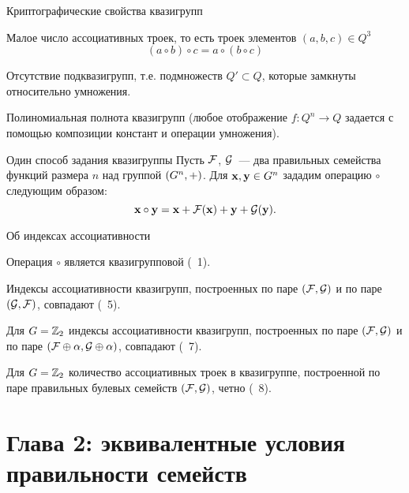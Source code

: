 \begin{frame}{Криптографические свойства квазигрупп}
    \begin{coloritemize}
        \item Малое число ассоциативных троек, то есть троек элементов $(a, b, c) \in Q^3$
        \[
            (a \circ b) \circ c = a \circ (b \circ c)
        \]
        \pause 
        \item Отсутствие подквазигрупп, т.е. подмножеств $Q' \subset Q$, которые замкнуты относительно умножения.
        \pause 
        \item Полиномиальная полнота квазигрупп (любое отображение $f \colon Q^n \to Q$ задается с помощью композиции констант и операции умножения).
    \end{coloritemize}
\end{frame}


\begin{frame}{Один способ задания квазигруппы}
    Пусть $\mathcal{F}$, $\mathcal{G}$~--- два правильных семейства функций размера $n$ над группой $(G^n, +)$.
    Для $\mathbf{x}, \mathbf{y} \in G^n$ зададим операцию $\circ$ следующим образом:
    \[
        \mathbf{x} \circ \mathbf{y} = \mathbf{x} + \mathcal{F}(\mathbf{x}) + \mathbf{y} + \mathcal{G}(\mathbf{y}).
    \]
    \pause 
    \begin{mytheorem}{Об индексах ассоциативности}
        \begin{coloritemize}
            \item Операция $\circ$ является квазигрупповой (\thm~1).
            \item Индексы ассоциативности квазигрупп, построенных по паре $(\mathcal{F}, \mathcal{G})$ и по паре $(\mathcal{G}, \mathcal{F})$, совпадают (\thm~5).
            \item Для $G = \mathbb{Z}_2$ индексы ассоциативности квазигрупп, построенных по паре $(\mathcal{F}, \mathcal{G})$ и по паре $(\mathcal{F} \oplus \alpha, \mathcal{G} \oplus \alpha)$, совпадают (\thm~7).
            \item Для $G = \mathbb{Z}_2$ количество ассоциативных троек в квазигруппе, построенной по паре правильных булевых семейств $(\mathcal{F}, \mathcal{G})$, четно (\thm~8).
        \end{coloritemize}
    \end{mytheorem}
\end{frame}


\section{Глава 2: эквивалентные условия правильности семейств}


